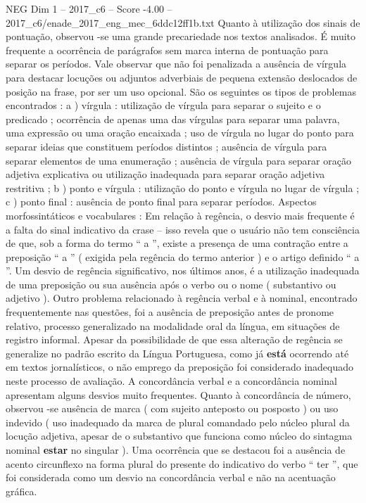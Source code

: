 \begin{textsample}{NEG Dim 1 – 2017\_c6 – Score -4.00 – 2017\_c6/enade\_2017\_eng\_mec\_6ddc12ff1b.txt}
Quanto à utilização dos sinais de pontuação, observou -se uma grande precariedade nos textos analisados.
É muito frequente a ocorrência de parágrafos sem marca interna de pontuação para separar os períodos.
Vale observar que não foi penalizada a ausência de vírgula para destacar locuções ou adjuntos adverbiais de pequena extensão deslocados de posição na frase, por ser um uso opcional.
São os seguintes os tipos de problemas encontrados : a ) vírgula : utilização de vírgula para separar o sujeito e o predicado ; ocorrência de apenas uma das vírgulas para separar uma palavra, uma expressão ou uma oração encaixada ; uso de vírgula no lugar do ponto para separar ideias que constituem períodos distintos ; ausência de vírgula para separar elementos de uma enumeração ; ausência de vírgula para separar oração adjetiva explicativa ou utilização inadequada para separar oração adjetiva restritiva ; b ) ponto e vírgula : utilização do ponto e vírgula no lugar de vírgula ; c ) ponto final : ausência de ponto final para separar períodos.
Aspectos morfossintáticos e vocabulares : Em relação à regência, o desvio mais frequente é a falta do sinal indicativo da crase – isso revela que o usuário não tem consciência de que, sob a forma do termo “ a ”, existe a presença de uma contração entre a preposição “ a ” ( exigida pela regência do termo anterior ) e o artigo definido “ a ”.
Um desvio de regência significativo, nos últimos anos, é a utilização inadequada de uma preposição ou sua ausência após o verbo ou o nome ( substantivo ou adjetivo ).
Outro problema relacionado à regência verbal e à nominal, encontrado frequentemente nas questões, foi a ausência de preposição antes de pronome relativo, processo generalizado na modalidade oral da língua, em situações de registro informal.
Apesar da possibilidade de que essa alteração de regência se generalize no padrão escrito da Língua Portuguesa, como já \textbf{está} ocorrendo até em textos jornalísticos, o não emprego da preposição foi considerado inadequado neste processo de avaliação.
A concordância verbal e a concordância nominal apresentam alguns desvios muito frequentes.
Quanto à concordância de número, observou -se ausência de marca ( com sujeito anteposto ou posposto ) ou uso indevido ( uso inadequado da marca de plural comandado pelo núcleo plural da locução adjetiva, apesar de o substantivo que funciona como núcleo do sintagma nominal \textbf{estar} no singular ).
Uma ocorrência que se destacou foi a ausência de acento circunflexo na forma plural do presente do indicativo do verbo “ ter ”, que foi considerada como um desvio na concordância verbal e não na acentuação gráfica.

\end{textsample}
